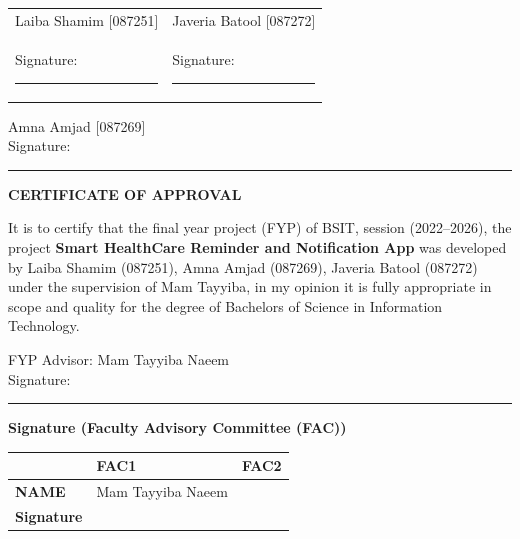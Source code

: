 \vspace{2cm}

\begin{tabular}{@{}p{}p{}@{}}
Laiba Shamim [087251] & Javeria Batool [087272] \\
Signature: \rule{4cm}{0.4pt} & Signature: \rule{4cm}{0.4pt} \\
\end{tabular}

\vspace{1.5cm}

Amna Amjad [087269]\\
Signature: \rule{4cm}{0.4pt}

\vfill

\newpage
\thispagestyle{empty}
\begin{center}
{\Large\bfseries CERTIFICATE OF APPROVAL}
\end{center}
\vspace{1cm}

It is to certify that the final year project (FYP) of BSIT, session (2022--2026), the project \textbf{Smart HealthCare Reminder and Notification App} was developed by Laiba Shamim (087251), Amna Amjad (087269), Javeria Batool (087272) under the supervision of Mam Tayyiba, in my opinion it is fully appropriate in scope and quality for the degree of Bachelors of Science in Information Technology.

\vspace{1.5cm}

FYP Advisor: Mam Tayyiba Naeem\\
Signature: \rule{5cm}{0.4pt}

\vspace{1cm}

\textbf{Signature (Faculty Advisory Committee (FAC))}

\vspace{0.5cm}

\begin{tabular}{|l|l|l|}
\hline
 & \textbf{FAC1} & \textbf{FAC2} \\ \hline
\textbf{NAME} & Mam Tayyiba Naeem & \\ \hline
\textbf{Signature} & & \\ \hline
\end{tabular}

\vspace{1.5cm}

